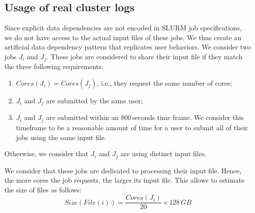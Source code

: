 \documentclass[sigconf,review,anonymous]{acmart}
\newcommand{\rev}[1]{{\color{black}{#1}}}
\newcommand{\file}{\ensuremath{\mathit{File}}\xspace}
\newcommand{\size}{\ensuremath{\mathit{Size}}\xspace}
\newcommand{\core}{\mathit{Cores}\xspace}
\begin{document}
\subsection{Usage of real cluster logs}
\label{sec.working}
\rev{The logs we use contain historical data on jobs, namely their
 exact submission time, their requested walltime, their actual duration, the number of cores they required and the corresponding user's name. 
}
%
Since explicit data dependencies are not encoded in SLURM job
specifications, we do not have access to the actual input files of
these jobs. We thus create an artificial data dependency pattern that
replicates user behaviors.
\rev{Each job uses exactly one input file.}
We consider two jobs $J_i$ and $J_j$. These jobs are considered to
share their input file if they match the three following requirements:
\begin{enumerate}
	\item $\core(J_i) = \core(J_j)$, i.e., they request the same number of cores;
	\item $J_i$ and $J_j$ are submitted by the same user;
	\item $J_i$ and $J_j$ are submitted within an 800\,seconds
          time frame. We consider this timeframe to be a reasonable amount of time for a user to submit all of their jobs using the same input file.
\end{enumerate}
Otherwise, we consider that $J_i$ and $J_j$ are using distinct input files. 
\rev{%
In theory, two users could share the same file. 
However, because they are using subsets of different databases, it is very unlikely that two
users would work on the same project using the same databases, therefore we ignore this possibility.
}

We consider that these jobs are dedicated to processing their input
file. Hence, the more cores the job requests, 
the larger its input file. This allows to estimate the size of files as follows:
$$\size(\file(i)) =\frac{\core(J_i)}{20} \times 128\,GB$$
\rev{%
Indeed, if a user needs 128\,GB of memory but would request only 1 of
the 20 available cores, that user would block the node for all other
users, for lack of remaining memory.
Consequently, a user who needs the whole memory of a node will reserve all its cores. 
}
\end{document}
